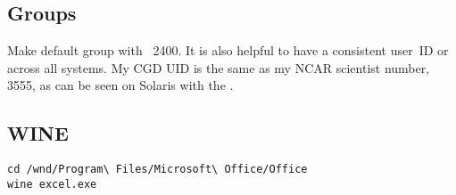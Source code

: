 \documentclass[12pt,twoside]{article}
\begin{document}
\subsection{Groups}\label{sxn:grp}
Make default group  with ~2400.
It is also helpful to have a consistent user~ID or  across 
all systems.
My CGD UID is the same as my NCAR scientist number, 3555, as can be
seen on Solaris with the .

\subsection{WINE}\label{sxn:wine}
\begin{verbatim}
cd /wnd/Program\ Files/Microsoft\ Office/Office
wine excel.exe
\end{verbatim}
\end{document}
